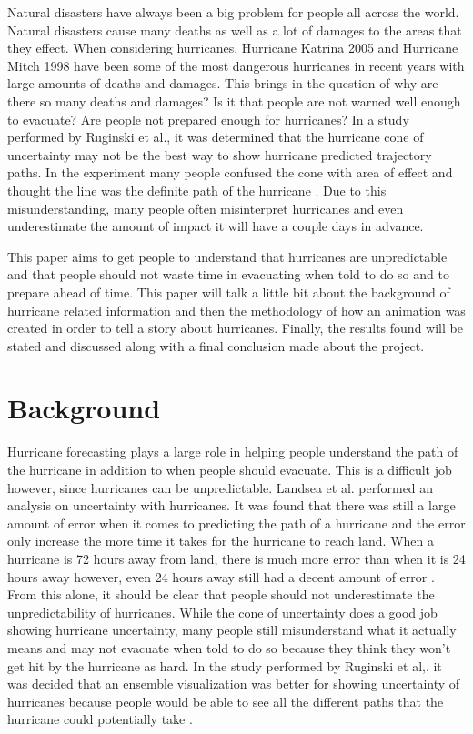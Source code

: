 
Natural disasters have always been a big problem for people all across the world. Natural disasters cause many deaths as well as a lot of damages to the areas that they effect. When considering hurricanes, Hurricane Katrina 2005 and Hurricane Mitch 1998 have been some of the most dangerous hurricanes in recent years with large amounts of deaths and damages. This brings in the question of why are there so many deaths and damages? Is it that people are not warned well enough to evacuate? Are people not prepared enough for hurricanes? In a study performed by Ruginski et al., it was determined that the hurricane cone of uncertainty may not be the best way to show hurricane predicted trajectory paths. In the experiment many people confused the cone with area of effect and thought the line was the definite path of the hurricane \cite{ruginski2016non}. Due to this misunderstanding, many people often misinterpret hurricanes and even underestimate the amount of impact it will have a couple days in advance. 

This paper aims to get people to understand that hurricanes are unpredictable and that people should not waste time in evacuating when told to do so and to prepare ahead of time. This paper will talk a little bit about the background of hurricane related information and then the methodology of how an animation was created in order to tell a story about hurricanes. Finally, the results found will be stated and discussed along with a final conclusion made about the project.

\section{Background}

Hurricane forecasting plays a large role in helping people understand the path of the hurricane in addition to when people should evacuate. This is a difficult job however, since hurricanes can be unpredictable. Landsea et al. performed an analysis on uncertainty with hurricanes. It was found that there was still a large amount of error when it comes to predicting the path of a hurricane and the error only increase the more time it takes for the hurricane to reach land. When a hurricane is 72 hours away from land, there is much more error than when it is 24 hours away however, even 24 hours away still had a decent amount of error \cite{landsea2013atlantic}. From this alone, it should be clear that people should not underestimate the unpredictability of hurricanes. While the cone of uncertainty does a good job showing hurricane uncertainty, many people still misunderstand what it actually means and may not evacuate when told to do so because they think they won't get hit by the hurricane as hard. In the study performed by Ruginski et al,. it was decided that an ensemble visualization was better for showing uncertainty of hurricanes because people would be able to see all the different paths that the hurricane could potentially take \cite{ruginski2016non}.


